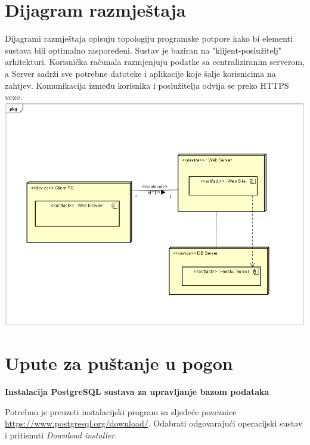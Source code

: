 		
		
		\section{Dijagram razmještaja}
			
        Dijagrami razmještaja opisuju topologiju programske potpore kako bi elementi sustava bili optimalno raspoređeni. Sustav je baziran na "klijent-poslužitelj" arhitekturi. Korisnička računala razmjenjuju podatke sa centraliziranim serverom, a Server sadrži sve potrebne datoteke i aplikacije koje šalje korisnicima na zahtjev. Komunikacija između korisnika i poslužitelja odvija se preko HTTPS veze.
		\newline
		\newline
		\newline
		\includegraphics[scale=0.85]{slike/dijagramRazmjestaja.png}
			
			\eject 
		
		\section{Upute za puštanje u pogon}
		
		    \textbf{Instalacija PostgreSQL sustava za upravljanje bazom podataka}
		    
		    Potrebno je preuzeti instalacijski program sa sljedeće poveznice \url{https://www.postgresql.org/download/}. Odabrati odgovarajući operacijski sustav i pritisnuti \textit{Download installer}.
		    
